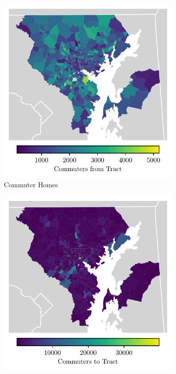 \documentclass[11pt]{article}
\numberwithin{equation}{section} %
\numberwithin{figure}{section} %
\numberwithin{table}{section} %
\theoremstyle{definition}
\begin{document}
\begin{figure}[t!]
	\caption{Baltimore Metro Area Census Tracts by Commuter Volume and Flow}
  \begin{subfigure}{0.49\textwidth}
    \centering
    \includegraphics[width=\textwidth]{maps/tract_home.pdf}
    \caption{Commuter Homes}
  \end{subfigure}
  \begin{subfigure}{0.49\textwidth}
    \centering
    \includegraphics[width=\textwidth]{maps/tract_work.pdf}

\end{subfigure}
\end{figure}
\end{document}
